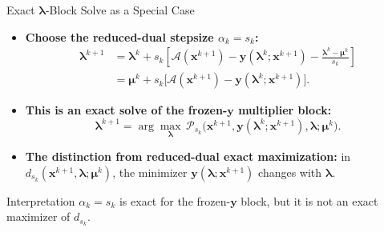 \documentclass[handout,compress,9pt]{beamer}
\newcommand{\blue}[1]{\textcolor{ddlblue}{#1}}
\newcommand{\bx}{\bm{x}}
\newcommand{\by}{\bm{y}}
\newcommand{\bmu}{\bm{\mu}}
\newcommand{\blmbd}{\bm{\lambda}}
\newcommand{\calA}{\mathcal{A}}
\begin{document}
\begin{frame}{Exact $\blmbd$-Block Solve as a Special Case}
\small
\begin{itemize}
  \item[\blue{$\triangleright$}]
  \textbf{Choose the reduced-dual stepsize $\alpha_k=s_k$:}
  \begin{equation*}
    \begin{aligned}
    \blmbd^{k+1}
    &=\blmbd^k+s_k
    \left[\calA(\bx^{k+1})-\by(\blmbd^k;\bx^{k+1})
    -\frac{\blmbd^k-\bmu^k}{s_k}\right] \\
    &=\bmu^k+s_k
    \bigl[\calA(\bx^{k+1})-\by(\blmbd^k;\bx^{k+1})\bigr].
    \end{aligned}
  \end{equation*}

  \item[\blue{$\triangleright$}]
  \textbf{This is an exact solve of the frozen-$\by$ multiplier block:}
  \begin{equation*}
    \blmbd^{k+1}
    =\arg\max_{\blmbd}\,
    \mathcal P_{s_k}
    \bigl(\bx^{k+1},\by(\blmbd^k;\bx^{k+1}),\blmbd;\bmu^k\bigr).
  \end{equation*}

  \item[\blue{$\triangleright$}]
  \textbf{The distinction from reduced-dual exact maximization:}
  in $d_{s_k}(\bx^{k+1},\blmbd;\bmu^k)$, the minimizer
  $\by(\blmbd;\bx^{k+1})$ changes with $\blmbd$.
\end{itemize}

\begin{block}{Interpretation}
$\alpha_k=s_k$ is exact for the frozen-$\by$ block, but it is not an exact
maximizer of $d_{s_k}$.
\end{block}
\end{frame}
\end{document}
